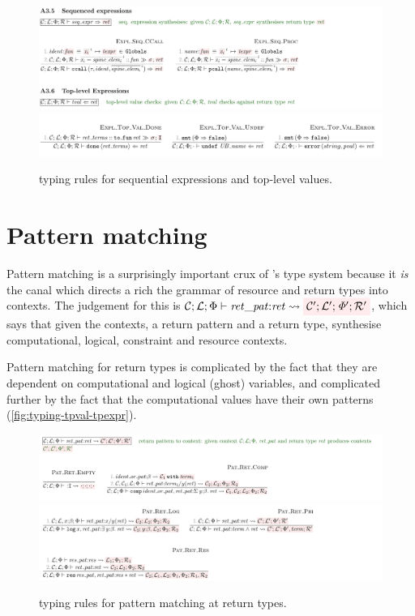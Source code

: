 \begin{figure}[tp]
    \includegraphics{figures/kernel-seq-expr-typing}
    \includegraphics{figures/kernel-tval-typing}
    \caption{ typing rules for sequential expressions and top-level values.}\label{fig:typing-seq-expr-tval}
\end{figure}

\section{Pattern matching}

Pattern matching is a surprisingly important crux of 's type
system because it \emph{is} the canal which directs a rich the grammar of
resource and return types into contexts. The judgement for this is
$\mathcal{C}; \mathcal{L}; \Phi \vdash \mathit{ret\_pat} {:} \mathit{ret}
\rightsquigarrow \outpol{\mathcal{C}'; \mathcal{L}'; \Phi'; \mathcal{R}'}$,
which says that given the contexts, a return pattern and a return type,
synthesise computational, logical, constraint and resource contexts.

Pattern matching for return types is complicated by the fact that they are
dependent on computational and logical (ghost) variables, and complicated
further by the fact that the computational values have their own patterns
(\cref{fig:typing-tpval-tpexpr}).

\begin{figure}[tp]
    \includegraphics{figures/kernel-ret-pat-typing-1}
    \includegraphics{figures/kernel-ret-pat-typing-2}
    \caption{ typing rules for pattern matching at return
        types.}\label{fig:typing-res-pat}
\end{figure}

